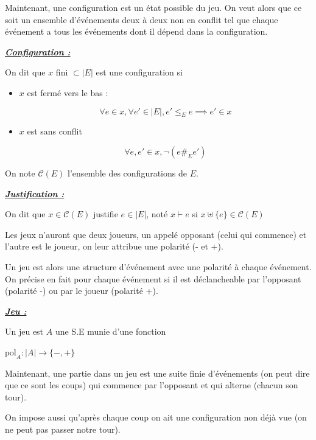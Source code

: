 \documentclass[a4paper,12pt]{article}
\renewenvironment{leftbar}{
  \def\FrameCommand{\vrule width 1pt \hspace{10pt}}
  \MakeFramed {\advance\hsize-\width \FrameRestore}
\setlength{\parskip}{10pt}}
 {\endMakeFramed}
\newenvironment{answer}[1]
{
  \vspace{0.5cm} \noindent \begin{minipage}{\linewidth}
    \textbf{\textit{\uline{#1}}}
    \begin{leftbar}
}
{
    \end{leftbar}\end{minipage}\vspace{0.2cm}
}
\begin{document}
Maintenant, une configuration est un état possible du jeu.
On veut alors que ce soit un ensemble d'événements deux à deux non en conflit
tel que chaque événement a tous les événements dont il dépend dans la
configuration.

\begin{answer}{Configuration :}

On dit que $x$ fini $\subset |E|$ est une configuration si
\begin{itemize}
\item $x$ est fermé vers le bas :

\begin{equation*}\forall e \in x, \forall e' \in |E|, e' \leq_E e \implies e' \in x\end{equation*}

\item $x$ est sans conflit

\begin{equation*}\forall e, e' \in x, \neg (e \#_E e')\end{equation*}
\end{itemize}
\end{answer}

On note $\mathcal{C}(E)$ l'ensemble des configurations de $E$.

\begin{answer}{Justification :}
On dit que $x \in \mathcal{C}(E)$ justifie $e \in |E|$, noté $x \vdash e$ si
$x \uplus \{e\} \in \mathcal{C}(E)$
\end{answer}

Les jeux n'auront que deux joueurs, un appelé opposant (celui qui commence)
et l'autre est le joueur, on leur attribue une polarité (- et +).

Un jeu est alors une structure d'événement avec une polarité à chaque événement.
On précise en fait pour chaque événement si il est déclancheable par l'opposant
(polarité -) ou par le joueur (polarité +).

\begin{answer}{Jeu :}
Un jeu est $A$ une S.E munie d'une fonction

$\text{pol}_A : |A| \rightarrow \{-, +\}$
\end{answer}

Maintenant, une partie dans un jeu est une suite finie d'événements (on peut
dire que ce sont les coups) qui commence par l'opposant et qui alterne
(chacun son tour).

On impose aussi qu'après chaque coup on ait une configuration non déjà vue
(on ne peut pas passer notre tour).
\end{document}
